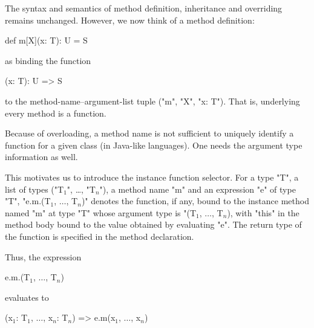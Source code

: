 The syntax and semantics of method definition, inheritance and
overriding remains unchanged. However, we now think of a method definition:

\begin{grammar}
def m[X](x: T): U = { S }
\end{grammar}

as binding the function

\begin{xten}
[X](x: T): U => { S }
\end{xten}

to the method-name--argument-list tuple (\xcd"m", \xcd"X",
\xcd"x: T").  That is, underlying every method is a function.

\begin{note}
Because of overloading, a method name is not sufficient to
uniquely identify a function for a given class (in Java-like languages).
One needs the argument type information as well.
\end{note}


This motivates us to introduce the instance function selector. For a
type \xcd"T", a list of types
(\xcdmath"T$_1$", \dots,
\xcdmath"T$_n$"), 
a method name
\xcd"m" and an expression \xcd"e" of type \xcd"T",
\xcdmath"e.m.(T$_1$, $\dots$, T$_n$)" denotes the function,
if any, bound to the instance method named \xcd"m" at type
\xcd"T" whose argument
type is
\xcdmath"(T$_1$, $\dots$, T$_n$), with \xcd"this" in the method
body bound to the value obtained
by evaluating \xcd"e". The
return type of the function is specified in the method declaration.

Thus, the expression

\begin{xtenmath}
e.m.(T$_1$, $\dots$, T$_n$)
\end{xtenmath}

evaluates to

\begin{xtenmath}
(x$_1$: T$_1$, $\dots$, x$_n$: T$_n$) => e.m(x$_1$, $\dots$, x$_n$)
\end{xtenmath}

